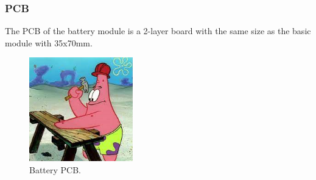     
    \subsubsection{PCB}
        The PCB of the battery module is a 2-layer board with the same size as the basic module
        with 35x70mm.

        \begin{figure}[H]
            \centering
            \includegraphics[width=0.4\textwidth]{assets/HW/TBD2.png}
            \caption{Battery PCB.}
        \end{figure}